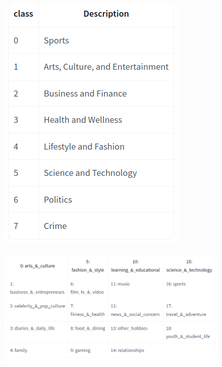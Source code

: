 \begin{figure}[H]
\centering
\begin{minipage}{.35\linewidth}
  \includegraphics[width=\linewidth]{Assets/topic-classes-1}
  \label{img1}
\end{minipage}
\hspace{.05\linewidth}
\begin{minipage}{.55\linewidth}
  \includegraphics[width=\linewidth]{Assets/topic-classes-2}
  \label{img2}
\end{minipage}
    \label{fig:huggingface-topic-labels}
\end{figure}

